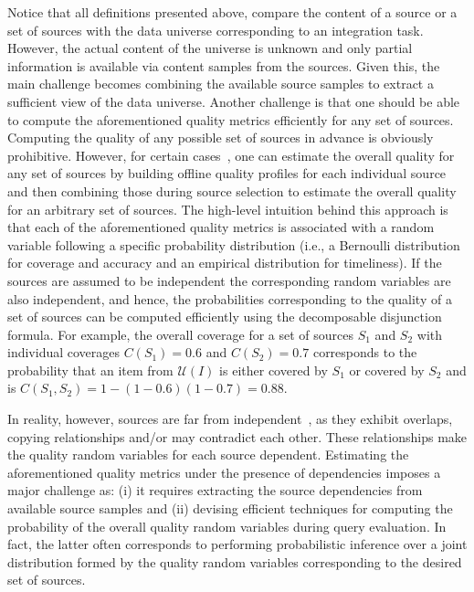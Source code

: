 \documentclass{sig-alternate}
\begin{document}
\vspace{5pt}Notice that all definitions presented above, compare the content of a source or a set of sources with the data universe corresponding to an integration task. However, the actual content of the universe is unknown and only partial information is available via content samples from the sources. Given this, the main challenge becomes combining the available source samples to extract a sufficient view of the data universe. Another challenge is that one should be able to compute the aforementioned quality metrics efficiently for any set of sources. Computing the quality of any possible set of sources in advance is obviously prohibitive. However, for certain cases~\cite{dong:vldb13,rekatsinas:2014}, one can estimate the overall quality for any set of sources by building offline quality profiles for each individual source and then combining those during source selection to estimate the overall quality for an arbitrary set of sources. The high-level intuition behind this approach is that each of the aforementioned quality metrics is associated with a random variable following a specific probability distribution (i.e., a Bernoulli distribution for coverage and accuracy and an empirical distribution for timeliness). If the sources are assumed to be independent the corresponding random variables are also independent, and hence, the probabilities corresponding to the quality of a set of sources can be computed efficiently using the decomposable disjunction formula. For example, the overall coverage for a set of sources $S_1$ and $S_2$ with individual coverages $C(S_1) = 0.6$ and $C(S_2) = 0.7$ corresponds to the probability that an item from $\mathcal{U}(I)$ is either covered by $S_1$ or covered by $S_2$ and is $C(S_1,S_2) = 1 - (1-0.6)(1-0.7) = 0.88$.


In reality, however, sources are far from independent~\cite{berti-equille:sailing, dong:2009}, as they exhibit overlaps, copying relationships and/or may contradict each other. These relationships make the quality random variables for each source dependent. Estimating the aforementioned quality metrics under the presence of dependencies imposes a major challenge as: (i) it  requires extracting the source dependencies from available source samples and (ii) devising efficient techniques for computing the probability of the overall quality random variables during query evaluation. In fact, the latter often corresponds to performing probabilistic inference over a joint distribution formed by the quality random variables corresponding to the desired set of sources.
\end{document}
